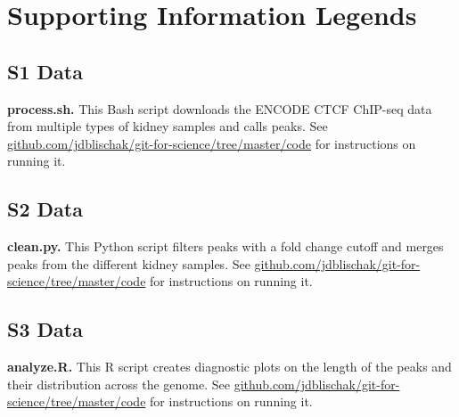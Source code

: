 \section*{Supporting Information Legends}

\subsection*{S1 Data}
\label{S1_Data}
{\bf process.sh.}
This Bash script downloads the ENCODE CTCF ChIP-seq data from multiple types of kidney samples and calls peaks.
See \href{https://github.com/jdblischak/git-for-science/tree/master/code}{github.com/jdblischak/git-for-science/tree/master/code} for instructions on running it.

\subsection*{S2 Data}
\label{S2_Data}
{\bf clean.py.}
This Python script filters peaks with a fold change cutoff and merges peaks from the different kidney samples.
See \href{https://github.com/jdblischak/git-for-science/tree/master/code}{github.com/jdblischak/git-for-science/tree/master/code} for instructions on running it.

\subsection*{S3 Data}
\label{S3_Data}
{\bf analyze.R.}
This R script creates diagnostic plots on the length of the peaks and their distribution across the genome.
See \href{https://github.com/jdblischak/git-for-science/tree/master/code}{github.com/jdblischak/git-for-science/tree/master/code} for instructions on running it.
